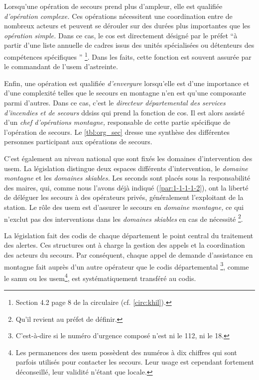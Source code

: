 Lorsqu'une opération de secours prend plus d'ampleur, elle est
qualifiée \emph{d'opération complexe.} Ces opérations nécessitent une
coordination entre de nombreux acteurs et peuvent se dérouler sur des
durées plus importantes que les \emph{opération simple.} Dans ce cas,
le \ac{cos} est directement désigné par le préfet \enquote{à partir
  d’une liste annuelle de cadres issus des unités spécialisées ou
  détenteurs des compétences spécifiques \textelp{}} \footnote{Section
  4.2 page 8 de la circulaire 
  (cf. \autoref{circ:khil}).}. Dans les faits, cette fonction est
souvent assurée par le commandant de l'\ac{usem} d'astreinte.

Enfin, une opération est qualifiée \emph{d'envergure} lorsqu'elle est
d'une importance et d'une complexité telles que le secours en montagne
n'en est qu'une composante parmi d'autres. Dans ce cas, c'est le
\emph{directeur départemental des services d'incendies et de secours}
\acp{ddsis} qui prend la fonction de \ac{cos}. Il est alors assisté
d'un \emph{chef d'opérations montagne,} responsable de cette partie
spécifique de l'opération de secours. Le \autoref{tbl:org_sec} dresse
une synthèse des différentes personnes participant aux opérations de
secours.

C'est également au niveau national que sont fixés les domaines
d'intervention des \ac{usem}. La législation distingue deux espaces
différents d'intervention, le \emph{domaine montagne} et les
\emph{domaines skiables.} Les seconds sont placés sous la
responsabilité des maires, qui, comme nous l'avons déjà indiqué
(\ref{par:1-1-1-1-2}), ont la liberté de déléguer les secours à des
opérateurs privés, généralement l'exploitant de la station. Le rôle
des \ac{usem} est d'assurer le secours en \emph{domaine montagne,} ce
qui n’exclut pas des interventions dans les \emph{domaines skiables}
en cas de nécessité \footnote{Qu'il revient au préfet de définir.}.

La législation fait des \ac{codis} de chaque département le point
central du traitement des alertes. Ces structures ont à charge la
gestion des appels et la coordination des acteurs du secours. Par
conséquent, chaque appel de demande d'assistance en montagne fait
auprès d'un autre opérateur que le \ac{codis} départemental
\footnote{C'est-à-dire si le numéro d'urgence composé n'est ni le 112,
  ni le 18.}, comme le \ac{samu} ou les \ac{usem}\footnote{Les
  permanences des \ac{usem} possèdent des numéros à dix chiffres qui
  sont parfois utilisés pour contacter les secours. Leur usage est
  cependant fortement déconseillé, leur validité n'étant que locale.},
est systématiquement transféré au \ac{codis}.

